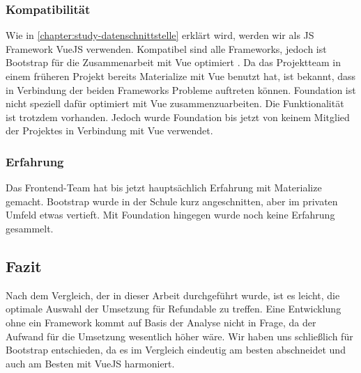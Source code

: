 \subsubsection{Kompatibilität}
\label{chapter:study-frontend-vergleich-kompatibilität}
Wie in \autoref{chapter:study-datenschnittstelle} erklärt wird, werden wir als JS Framework VueJS verwenden. Kompatibel sind alle Frameworks, jedoch ist Bootstrap für die Zusammenarbeit mit Vue optimiert \cite{bootstrap-docu}. Da das Projektteam in einem früheren Projekt bereits Materialize mit Vue benutzt hat, ist bekannt, dass in Verbindung der beiden Frameworks Probleme auftreten können. Foundation ist nicht speziell dafür optimiert mit Vue zusammenzuarbeiten. Die Funktionalität ist trotzdem vorhanden. Jedoch wurde Foundation bis jetzt von keinem Mitglied der Projektes in Verbindung mit Vue verwendet.

\subsubsection{Erfahrung}
\label{chapter:study-frontend-vergleich-erfahrung}
Das Frontend-Team hat bis jetzt hauptsächlich Erfahrung mit Materialize gemacht. Bootstrap wurde in der Schule kurz angeschnitten, aber im privaten Umfeld etwas vertieft. Mit Foundation hingegen wurde noch keine Erfahrung gesammelt.

\subsection{Fazit}
\label{chapter:study-frontend-vergleich-fazit}
Nach dem Vergleich, der in dieser Arbeit durchgeführt wurde, ist es leicht, die optimale Auswahl der Umsetzung für Refundable zu treffen. Eine Entwicklung ohne ein Framework kommt auf Basis der Analyse nicht in Frage, da der Aufwand für die Umsetzung wesentlich höher wäre. Wir haben uns schließlich für Bootstrap entschieden, da es im Vergleich eindeutig am besten abschneidet und auch am Besten mit VueJS harmoniert.

